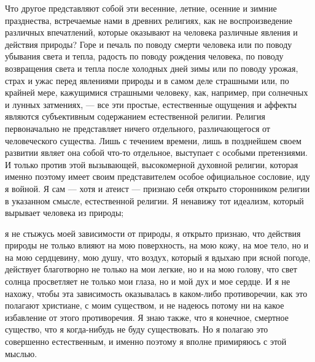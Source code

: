 \documentclass[12pt]{article}
\begin{document}
Что другое представляют собой эти весенние, летние, осенние и зимние празднества, встречаемые нами в древних религиях, как не воспроизведение различных впечатлений, которые оказывают на человека различные явления и действия природы? Горе и печаль по поводу смерти человека или по поводу убывания света и тепла, радость по поводу рождения человека, по поводу возвращения света и тепла после холодных дней зимы или по поводу урожая, страх и ужас перед явлениями природы и в самом деле страшными или, по крайней мере, кажущимися страшными человеку, как, например, при солнечных и лунных затмениях, --- все эти простые, естественные ощущения и аффекты являются субъективным содержанием естественной религии. Религия первоначально не представляет ничего отдельного, различающегося от человеческого существа. Лишь с течением времени, лишь в позднейшем своем развитии являет она собой что-то отдельное, выступает с особыми претензиями. И только против этой вызывающей, высокомерной духовной религии, которая именно поэтому имеет своим представителем особое официальное сословие, иду я войной. Я сам --- хотя и атеист --- признаю себя открыто сторонником религии в указанном смысле, естественной религии. Я ненавижу тот идеализм, который вырывает человека из природы; 

я не стыжусь моей зависимости от природы, я открыто признаю, что действия природы не только влияют на мою поверхность, на мою кожу, на мое тело, но и на мою сердцевину, мою душу, что воздух, который я вдыхаю при ясной погоде, действует благотворно не только на мои легкие, но и на мою голову, что свет солнца просветляет не только мои глаза, но и мой дух и мое сердце. И я не нахожу, чтобы эта зависимость оказывалась в каком-либо противоречии, как это полагают христиане, с моим существом, и не надеюсь потому ни на какое избавление от этого противоречия. Я знаю также, что я конечное, смертное существо, что я когда-нибудь не буду существовать. Но я полагаю это совершенно естественным, и именно поэтому я вполне примиряюсь с этой мыслью. 
\end{document}
